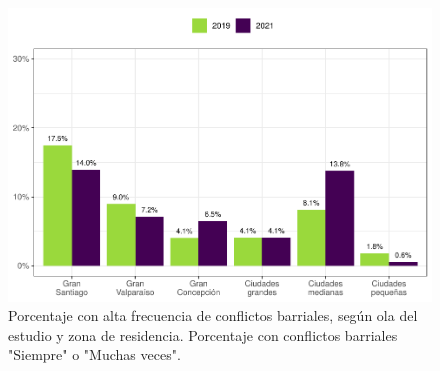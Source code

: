 \documentclass[
  12pt,
]{book}
\begin{document}
\begin{figure}

{\centering \includegraphics{reporte-elsoc_files/figure-latex/confli-estrato-1} 

}

\caption{Porcentaje con alta frecuencia de conflictos barriales, según ola del estudio y zona de residencia. Porcentaje con conflictos barriales "Siempre" o "Muchas veces".}\label{fig:confli-estrato}
\end{figure}
\end{document}
